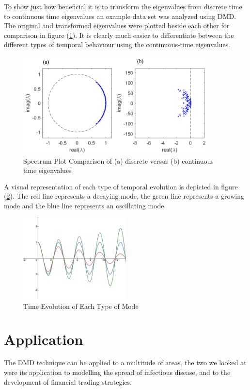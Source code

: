 \documentclass[12pt]{report}
\begin{document}
To show just how beneficial it is to transform the eigenvalues from discrete time to continuous time eigenvalues an example data set was analyzed using DMD. The original and transformed eigenvalues were plotted beside each other for comparison in figure (\ref{fig:comp}). It is clearly much easier to differentiate between the different types of temporal behaviour using the continuous-time eigenvalues.

\begin{figure}[H]
    \centering
    \includegraphics[width=0.9\textwidth]{Application pics/MA680 Dis to Con (Ep).png}
    \caption{Spectrum Plot Comparison of (a) discrete versus (b) continuous time eigenvalues} \label{fig:comp}
\end{figure}
\noindent

A visual representation of each type of temporal evolution is depicted in figure (\ref{fig:modeEv}). The red line represents a decaying mode, the green line represents a growing mode and the blue line represents an oscillating mode. 

\begin{figure}[H]
    \centering
    \includegraphics[width=0.5\textwidth]{mode evolution.png}
    \caption{Time Evolution of Each Type of Mode} \label{fig:modeEv}
\end{figure}
\noindent
\chapter{Application}
The DMD technique can be applied to a multitude of areas, the two we looked at were its application to modelling the spread of infectious disease, and to the development of financial trading strategies.
\end{document}
